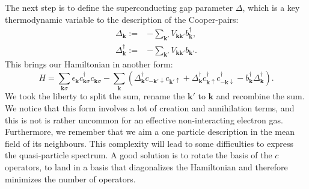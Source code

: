 \documentclass[../main.tex]{subfile}
\begin{document}
The next step is to define the superconducting gap parameter $\Delta$, which is a key thermodynamic variable to the description of the Cooper-pairs:
\begin{align}
    \Delta_{\bm{k}} := &-\sum_{\bm{k}'} V_{\bm{k}\bm{k}'} b_{\bm{k}}^{\dagger},\\
    \Delta^{\dagger}_{\bm{k}} := &-\sum_{\bm{k}'} V_{\bm{k}\bm{k}'} b_{\bm{k}'}.\label{eq:DeltaBaseDef}
\end{align}
This brings our Hamiltonian in another form:
\begin{equation} \label{eq:HamiltonianBCS1}
    H = \sum_{\bm{k}\sigma} \epsilon_{\bm{k}} c_{\bm{k}\sigma}^{\dagger}c_{\bm{k}\sigma} - \sum_{\bm{k}} \left( \Delta_{\bm{k}}^{\dagger} c_{-\bm{k}'\downarrow}c_{\bm{k}'\uparrow}  + \Delta_{\bm{k}}^{\dagger} c_{\bm{k}\uparrow} ^{\dagger}c_{-\bm{k}\downarrow}^{\dagger} -  b_{\bm{k}}^{\dagger} \Delta_{\bm{k}}^{\dagger} \right).
\end{equation}
We took the liberty to split the sum, rename the $\bm{k}'$ to $\bm{k}$ and recombine the sum. We notice that this form involves a lot of creation and annihilation terms, and this is not 
is rather uncommon for an effective non-interacting electron gas. Furthermore, we remember that we aim a one particle description in the mean field of its neighbours.
This complexity will lead to some difficulties to express the quasi-particle spectrum. A good solution is 
to rotate the basis of the $c$ operators, to land in a basis that diagonalizes the Hamiltonian and therefore minimizes the number of operators.\\
\end{document}
